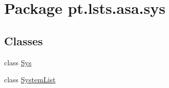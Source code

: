 \hypertarget{namespacept_1_1lsts_1_1asa_1_1sys}{}\section{Package pt.\+lsts.\+asa.\+sys}
\label{namespacept_1_1lsts_1_1asa_1_1sys}
\subsection*{Classes}
\begin{DoxyCompactItemize}
\item 
class \hyperlink{classpt_1_1lsts_1_1asa_1_1sys_1_1Sys}{Sys}
\item 
class \hyperlink{classpt_1_1lsts_1_1asa_1_1sys_1_1SystemList}{System\+List}
\end{DoxyCompactItemize}
